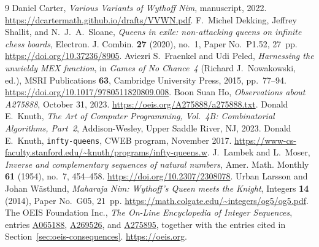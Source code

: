 \begin{thebibliography}{9}
Daniel Carter,
\emph{Various Variants of Wythoff Nim}, manuscript, 2022.
\url{https://dcartermath.github.io/drafts/VVWN.pdf}.
F.~Michel Dekking, Jeffrey Shallit, and N.~J.~A.~Sloane,
\emph{Queens in exile: non-attacking queens on infinite chess boards},
Electron. J. Combin. \textbf{27} (2020), no.~1, Paper No.~P1.52, 27~pp.
\url{https://doi.org/10.37236/8905}.
Aviezri S.~Fraenkel and Udi Peled,
\emph{Harnessing the unwieldy MEX function},
in \emph{Games of No Chance~4} (Richard J.~Nowakowski, ed.),
MSRI Publications \textbf{63}, Cambridge University Press, 2015, pp.~77--94.
\url{https://doi.org/10.1017/9780511820809.008}.
Boon Suan Ho,
\emph{Observations about A275888}, October 31, 2023.
\url{https://oeis.org/A275888/a275888.txt}.
Donald E.~Knuth,
\emph{The Art of Computer Programming, Vol.~4B: Combinatorial Algorithms, Part~2},
Addison-Wesley, Upper Saddle River, NJ, 2023.
Donald E.~Knuth,
\texttt{infty-queens}, CWEB program, November 2017.
\url{https://www-cs-faculty.stanford.edu/~knuth/programs/infty-queens.w}.
J.~Lambek and L.~Moser,
\emph{Inverse and complementary sequences of natural numbers},
Amer. Math. Monthly \textbf{61} (1954), no.~7, 454--458.
\url{https://doi.org/10.2307/2308078}.
Urban Larsson and Johan W\"astlund,
\emph{Maharaja Nim: Wythoff's Queen meets the Knight},
Integers \textbf{14} (2014), Paper No.~G05, 21~pp.
\url{https://math.colgate.edu/~integers/og5/og5.pdf}.
The OEIS Foundation Inc.,
\emph{The On-Line Encyclopedia of Integer Sequences}, entries
\href{https://oeis.org/A065188}{A065188},
\href{https://oeis.org/A269526}{A269526}, and
\href{https://oeis.org/A275895}{A275895}, together with the entries cited in
Section~\ref{sec:oeis-consequences}.
\url{https://oeis.org}.
\end{thebibliography}
